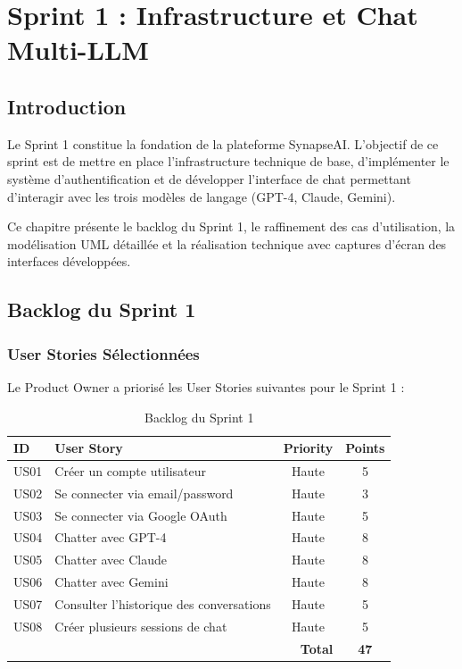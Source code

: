 
\chapter{Sprint 1 : Infrastructure et Chat Multi-LLM}
\label{chap:sprint1}

\section{Introduction}

Le Sprint 1 constitue la fondation de la plateforme SynapseAI. L'objectif de ce sprint est de mettre en place l'infrastructure technique de base, d'implémenter le système d'authentification et de développer l'interface de chat permettant d'interagir avec les trois modèles de langage (GPT-4, Claude, Gemini).

Ce chapitre présente le backlog du Sprint 1, le raffinement des cas d'utilisation, la modélisation UML détaillée et la réalisation technique avec captures d'écran des interfaces développées.

\section{Backlog du Sprint 1}

\subsection{User Stories Sélectionnées}

Le Product Owner a priorisé les User Stories suivantes pour le Sprint 1 :

\begin{table}[H]
\centering
\caption{Backlog du Sprint 1}
\label{tab:backlog-sprint1}
\begin{tabular}{|l|p{7cm}|c|c|}
\hline
\textbf{ID} & \textbf{User Story} & \textbf{Priority} & \textbf{Points} \\
\hline
US01 & Créer un compte utilisateur & Haute & 5 \\
\hline
US02 & Se connecter via email/password & Haute & 3 \\
\hline
US03 & Se connecter via Google OAuth & Haute & 5 \\
\hline
US04 & Chatter avec GPT-4 & Haute & 8 \\
\hline
US05 & Chatter avec Claude & Haute & 8 \\
\hline
US06 & Chatter avec Gemini & Haute & 8 \\
\hline
US07 & Consulter l'historique des conversations & Haute & 5 \\
\hline
US08 & Créer plusieurs sessions de chat & Haute & 5 \\
\hline
\multicolumn{3}{|r|}{\textbf{Total}} & \textbf{47} \\
\hline
\end{tabular}
\end{table}

